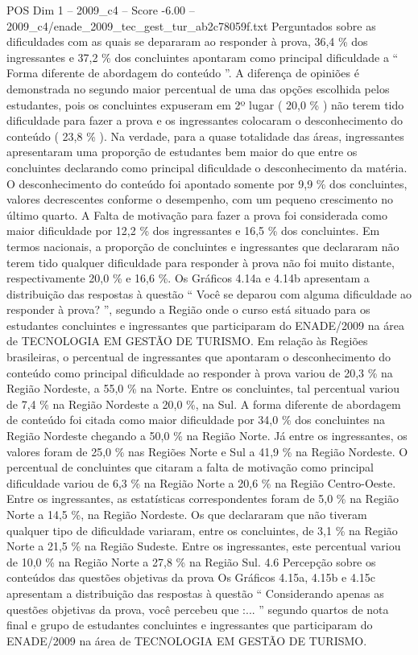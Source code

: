 \begin{textsample}{POS Dim 1 – 2009\_c4 – Score -6.00 – 2009\_c4/enade\_2009\_tec\_gest\_tur\_ab2c78059f.txt}
Perguntados sobre as dificuldades com as quais se depararam ao responder à prova, 36,4 \% dos ingressantes e 37,2 \% dos concluintes apontaram como principal dificuldade a “ Forma diferente de abordagem do conteúdo ”.
A diferença de opiniões é demonstrada no segundo maior percentual de uma das opções escolhida pelos estudantes, pois os concluintes expuseram em 2º lugar ( 20,0 \% ) não terem tido dificuldade para fazer a prova e os ingressantes colocaram o desconhecimento do conteúdo ( 23,8 \% ).
Na verdade, para a quase totalidade das áreas, ingressantes apresentaram uma proporção de estudantes bem maior do que entre os concluintes declarando como principal dificuldade o desconhecimento da matéria.
O desconhecimento do conteúdo foi apontado somente por 9,9 \% dos concluintes, valores decrescentes conforme o desempenho, com um pequeno crescimento no último quarto.
A Falta de motivação para fazer a prova foi considerada como maior dificuldade por 12,2 \% dos ingressantes e 16,5 \% dos concluintes.
Em termos nacionais, a proporção de concluintes e ingressantes que declararam não terem tido qualquer dificuldade para responder à prova não foi muito distante, respectivamente 20,0 \% e 16,6 \%.
Os Gráficos 4.14a e 4.14b apresentam a distribuição das respostas à questão “ Você se deparou com alguma dificuldade ao responder à prova? ”, segundo a Região onde o curso está situado para os estudantes concluintes e ingressantes que participaram do ENADE/2009 na área de TECNOLOGIA EM GESTÃO DE TURISMO.
Em relação às Regiões brasileiras, o percentual de ingressantes que apontaram o desconhecimento do conteúdo como principal dificuldade ao responder à prova variou de 20,3 \% na Região Nordeste, a 55,0 \% na Norte.
Entre os concluintes, tal percentual variou de 7,4 \% na Região Nordeste a 20,0 \%, na Sul.
A forma diferente de abordagem de conteúdo foi citada como maior dificuldade por 34,0 \% dos concluintes na Região Nordeste chegando a 50,0 \% na Região Norte.
Já entre os ingressantes, os valores foram de 25,0 \% nas Regiões Norte e Sul a 41,9 \% na Região Nordeste.
O percentual de concluintes que citaram a falta de motivação como principal dificuldade variou de 6,3 \% na Região Norte a 20,6 \% na Região Centro-Oeste.
Entre os ingressantes, as estatísticas correspondentes foram de 5,0 \% na Região Norte a 14,5 \%, na Região Nordeste.
Os que declararam que não tiveram qualquer tipo de dificuldade variaram, entre os concluintes, de 3,1 \% na Região Norte a 21,5 \% na Região Sudeste.
Entre os ingressantes, este percentual variou de 10,0 \% na Região Norte a 27,8 \% na Região Sul. 4.6 Percepção sobre os conteúdos das questões objetivas da prova Os Gráficos 4.15a, 4.15b e 4.15c apresentam a distribuição das respostas à questão “ Considerando apenas as questões objetivas da prova, você percebeu que :... ” segundo quartos de nota final e grupo de estudantes concluintes e ingressantes que participaram do ENADE/2009 na área de TECNOLOGIA EM GESTÃO DE TURISMO.

\end{textsample}

